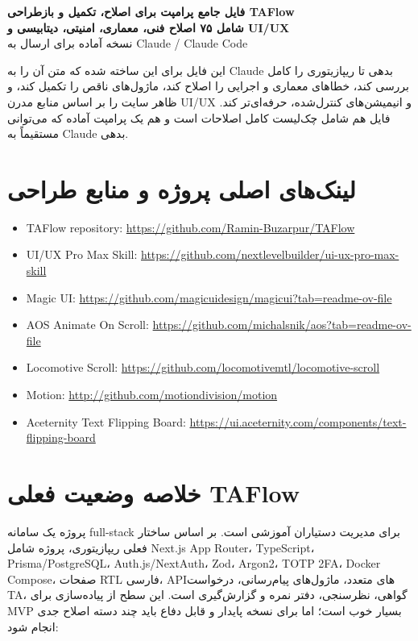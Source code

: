 \documentclass[12pt,a4paper]{article}
\newcommand{\code}[1]{\lr{\texttt{\detokenize{#1}}}}
\begin{document}
\begin{center}
{\Huge \textbf{فایل جامع پرامپت برای اصلاح، تکمیل و بازطراحی TAFlow}}\\[6pt]
{\Large \textbf{شامل ۷۵ اصلاح فنی، معماری، امنیتی، دیتابیسی و UI/UX}}\\[6pt]
{\large نسخه آماده برای ارسال به Claude / Claude Code}\\[10pt]
\end{center}

\begin{tcolorbox}[title=هدف فایل]
این فایل برای این ساخته شده که متن آن را به Claude بدهی تا ریپازیتوری \code{TAFlow} را کامل بررسی کند، خطاهای معماری و اجرایی را اصلاح کند، ماژول‌های ناقص را تکمیل کند، و ظاهر سایت را بر اساس منابع مدرن UI/UX و انیمیشن‌های کنترل‌شده، حرفه‌ای‌تر کند. فایل هم شامل چک‌لیست کامل اصلاحات است و هم یک پرامپت آماده که می‌توانی مستقیماً به Claude بدهی.
\end{tcolorbox}

\section{لینک‌های اصلی پروژه و منابع طراحی}
\begin{latin}
\begin{itemize}
  \item TAFlow repository: \url{https://github.com/Ramin-Buzarpur/TAFlow}
  \item UI/UX Pro Max Skill: \url{https://github.com/nextlevelbuilder/ui-ux-pro-max-skill}
  \item Magic UI: \url{https://github.com/magicuidesign/magicui?tab=readme-ov-file}
  \item AOS Animate On Scroll: \url{https://github.com/michalsnik/aos?tab=readme-ov-file}
  \item Locomotive Scroll: \url{https://github.com/locomotivemtl/locomotive-scroll}
  \item Motion: \url{http://github.com/motiondivision/motion}
  \item Aceternity Text Flipping Board: \url{https://ui.aceternity.com/components/text-flipping-board}
\end{itemize}
\end{latin}

\section{خلاصه وضعیت فعلی TAFlow}
پروژه \code{TAFlow} یک سامانه full-stack برای مدیریت دستیاران آموزشی است. بر اساس ساختار فعلی ریپازیتوری، پروژه شامل Next.js App Router، TypeScript، Prisma/PostgreSQL، Auth.js/NextAuth، Zod، Argon2، TOTP 2FA، Docker Compose، صفحات RTL فارسی، APIهای متعدد، ماژول‌های پیام‌رسانی، درخواست TA، گواهی، نظرسنجی، دفتر نمره و گزارش‌گیری است. این سطح از پیاده‌سازی برای MVP بسیار خوب است؛ اما برای نسخه پایدار و قابل دفاع باید چند دسته اصلاح جدی انجام شود:
\end{document}
